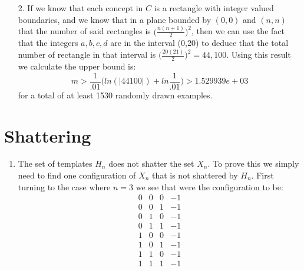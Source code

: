 \documentclass[11pt,a4paper]{article}
\begin{document}
\begin{itemize}
\begin{enumerate} [label={\alph*)}]
					$$\displaystyle\sum_{k=1}^{N} 3^k{N \choose k}$$
					
					\item From Occam's Razor we have $$m > \frac{1}{\epsilon} \Big( ln(\vert H \vert) + ln\frac{1}{\delta}\Big)$$
					Having calculated our hypothesis spaces in parts a and b, and knowing that the experienced worker is making the products (taking the hypothesis space from part b) we have that $H=\displaystyle\sum_{k=1}^{6} 3^k{6 \choose k}=4095$, and substituting in what we know yields the following:
					$$m > \frac{1}{.01} \Big( ln(\vert 4095 \vert) + ln\frac{1}{.01}\Big) > 1.292269e+03 $$
					for a total of at least 1293 examples.
					
				\end{enumerate}
				
			\item [2.]
				If we know that each concept in $C$ is a rectangle with integer valued boundaries, and we know that in a plane bounded by $(0,0)$ and $(n,n)$ that the number of said rectangles is $\Big( \frac{n(n+1)}{2} \Big)^2$, then we can use the fact that the integers $a,b,c,d$ are in the interval (0,20) to deduce that the total number of rectangle in that interval is $\Big( \frac{20(21)}{2} \Big)^2 = 44,100$. Using this result we calculate the upper bound is:
				$$m > \frac{1}{.01} \Big( ln(\vert 44100 \vert) + ln\frac{1}{.01}\Big) > 1.529939e+03 $$
				for a total of at least 1530 randomly drawn examples.
		\end{itemize}
		
	\section{Shattering}
		\begin{enumerate}
			\item The set of templates $H_n$ does not shatter the set $X_n$. To prove this we simply need to find one configuration of $X_n$ that is not shattered by $H_n$. First turning to the case where $n=3$ we see that were the configuration to be:
			$$\begin{array}{ccc|c} 
				0 & 0 & 0 & -1 \\
				0 & 0 & 1 & -1 \\
				0 & 1 & 0 & -1 \\
				0 & 1 & 1 & -1 \\
				1 & 0 & 0 & -1 \\
				1 & 0 & 1 & -1 \\
				1 & 1 & 0 & -1 \\
				1 & 1 & 1 & -1 
			\end{array}$$
		\end{enumerate}
	
\end{document}
